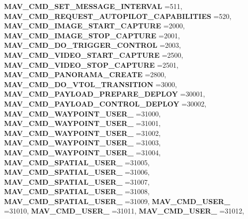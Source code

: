 \begin{DoxyCompactItemize}
\textbf{ M\+A\+V\+\_\+\+C\+M\+D\+\_\+\+S\+E\+T\+\_\+\+M\+E\+S\+S\+A\+G\+E\+\_\+\+I\+N\+T\+E\+R\+V\+AL} =511, 
\textbf{ M\+A\+V\+\_\+\+C\+M\+D\+\_\+\+R\+E\+Q\+U\+E\+S\+T\+\_\+\+A\+U\+T\+O\+P\+I\+L\+O\+T\+\_\+\+C\+A\+P\+A\+B\+I\+L\+I\+T\+I\+ES} =520, 
\textbf{ M\+A\+V\+\_\+\+C\+M\+D\+\_\+\+I\+M\+A\+G\+E\+\_\+\+S\+T\+A\+R\+T\+\_\+\+C\+A\+P\+T\+U\+RE} =2000, 
\textbf{ M\+A\+V\+\_\+\+C\+M\+D\+\_\+\+I\+M\+A\+G\+E\+\_\+\+S\+T\+O\+P\+\_\+\+C\+A\+P\+T\+U\+RE} =2001, 
\newline
\textbf{ M\+A\+V\+\_\+\+C\+M\+D\+\_\+\+D\+O\+\_\+\+T\+R\+I\+G\+G\+E\+R\+\_\+\+C\+O\+N\+T\+R\+OL} =2003, 
\textbf{ M\+A\+V\+\_\+\+C\+M\+D\+\_\+\+V\+I\+D\+E\+O\+\_\+\+S\+T\+A\+R\+T\+\_\+\+C\+A\+P\+T\+U\+RE} =2500, 
\textbf{ M\+A\+V\+\_\+\+C\+M\+D\+\_\+\+V\+I\+D\+E\+O\+\_\+\+S\+T\+O\+P\+\_\+\+C\+A\+P\+T\+U\+RE} =2501, 
\textbf{ M\+A\+V\+\_\+\+C\+M\+D\+\_\+\+P\+A\+N\+O\+R\+A\+M\+A\+\_\+\+C\+R\+E\+A\+TE} =2800, 
\newline
\textbf{ M\+A\+V\+\_\+\+C\+M\+D\+\_\+\+D\+O\+\_\+\+V\+T\+O\+L\+\_\+\+T\+R\+A\+N\+S\+I\+T\+I\+ON} =3000, 
\textbf{ M\+A\+V\+\_\+\+C\+M\+D\+\_\+\+P\+A\+Y\+L\+O\+A\+D\+\_\+\+P\+R\+E\+P\+A\+R\+E\+\_\+\+D\+E\+P\+L\+OY} =30001, 
\textbf{ M\+A\+V\+\_\+\+C\+M\+D\+\_\+\+P\+A\+Y\+L\+O\+A\+D\+\_\+\+C\+O\+N\+T\+R\+O\+L\+\_\+\+D\+E\+P\+L\+OY} =30002, 
\textbf{ M\+A\+V\+\_\+\+C\+M\+D\+\_\+\+W\+A\+Y\+P\+O\+I\+N\+T\+\_\+\+U\+S\+E\+R\+\_} =31000, 
\newline
\textbf{ M\+A\+V\+\_\+\+C\+M\+D\+\_\+\+W\+A\+Y\+P\+O\+I\+N\+T\+\_\+\+U\+S\+E\+R\+\_} =31001, 
\textbf{ M\+A\+V\+\_\+\+C\+M\+D\+\_\+\+W\+A\+Y\+P\+O\+I\+N\+T\+\_\+\+U\+S\+E\+R\+\_} =31002, 
\textbf{ M\+A\+V\+\_\+\+C\+M\+D\+\_\+\+W\+A\+Y\+P\+O\+I\+N\+T\+\_\+\+U\+S\+E\+R\+\_} =31003, 
\textbf{ M\+A\+V\+\_\+\+C\+M\+D\+\_\+\+W\+A\+Y\+P\+O\+I\+N\+T\+\_\+\+U\+S\+E\+R\+\_} =31004, 
\newline
\textbf{ M\+A\+V\+\_\+\+C\+M\+D\+\_\+\+S\+P\+A\+T\+I\+A\+L\+\_\+\+U\+S\+E\+R\+\_} =31005, 
\textbf{ M\+A\+V\+\_\+\+C\+M\+D\+\_\+\+S\+P\+A\+T\+I\+A\+L\+\_\+\+U\+S\+E\+R\+\_} =31006, 
\textbf{ M\+A\+V\+\_\+\+C\+M\+D\+\_\+\+S\+P\+A\+T\+I\+A\+L\+\_\+\+U\+S\+E\+R\+\_} =31007, 
\textbf{ M\+A\+V\+\_\+\+C\+M\+D\+\_\+\+S\+P\+A\+T\+I\+A\+L\+\_\+\+U\+S\+E\+R\+\_} =31008, 
\newline
\textbf{ M\+A\+V\+\_\+\+C\+M\+D\+\_\+\+S\+P\+A\+T\+I\+A\+L\+\_\+\+U\+S\+E\+R\+\_} =31009, 
\textbf{ M\+A\+V\+\_\+\+C\+M\+D\+\_\+\+U\+S\+E\+R\+\_} =31010, 
\textbf{ M\+A\+V\+\_\+\+C\+M\+D\+\_\+\+U\+S\+E\+R\+\_} =31011, 
\textbf{ M\+A\+V\+\_\+\+C\+M\+D\+\_\+\+U\+S\+E\+R\+\_} =31012, 

\end{DoxyCompactItemize}
